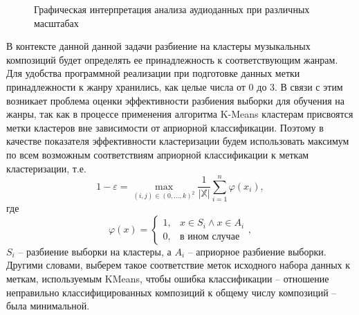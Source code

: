 \begin{figure}[H]
	\caption{Графическая интерпретация анализа аудиоданных при различных масштабах}
\label{fig:plot}
\end{figure}

В контексте данной данной задачи разбиение на кластеры музыкальных композиций будет определять ее принадлежность к соответствующим жанрам.
Для удобства программной реализации при подготовке данных метки принадлежности к жанру
хранились, как целые числа от 0 до 3. В связи с этим возникает проблема оценки эффективности
разбиения выборки для обучения на жанры, так как в процессе применения алгоритма K-Means кластерам
присвоятся метки кластеров вне зависимости от априорной классификации. Поэтому в качестве показателя эффективности
кластеризации будем использовать максимум по всем возможным соответствиям априорной классификации к меткам кластеризации, т.е.
\begin{equation}
	1 - \varepsilon = \underset{(i,j) \in (0, \dots, k)^2}{\max} \frac{1}{\left|\mathbb{X}\right|}\sum_{i=1}^n \varphi(x_i),
\end{equation}
где
	$$\varphi(x) = 
	\begin{cases}
		1, &  x \in S_i \wedge x \in A_i \\
		0, & \text{в ином случае}
	\end{cases}, $$
	$S_i$ -- разбиение выборки на кластеры, а $A_i$ -- априорное разбиение выборки.
Другими словами, выберем такое соответствие меток исходного набора данных к меткам, используемым KMeans, чтобы ошибка классификации -- отношение неправильно классифицированных композиций к общему числу композиций -- была минимальной.

